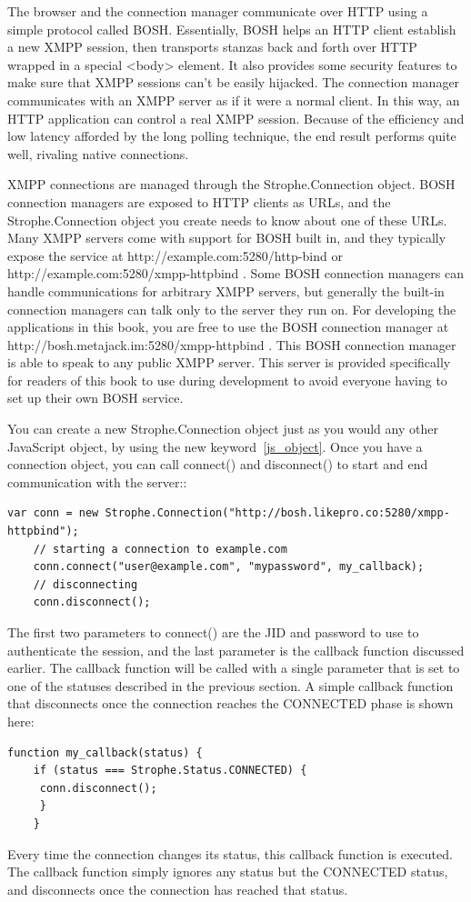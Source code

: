 	The browser and the connection manager communicate over HTTP using a simple protocol called BOSH. Essentially, BOSH helps an HTTP client establish a new XMPP session, then transports stanzas back and forth over HTTP wrapped in a special <body> element. It also provides some security features to make sure that XMPP sessions can’t be easily hijacked. The connection manager communicates with an XMPP server as if it were a normal client. In this way, an HTTP application can control a real XMPP session. Because of the efficiency and low latency afforded by the long polling technique, the end result performs quite well, rivaling native connections.

	XMPP connections are managed through the Strophe.Connection object. BOSH connection managers are exposed to HTTP clients as URLs, and the Strophe.Connection object you create needs to know about one of these URLs. Many XMPP servers come with support for BOSH built in, and they typically expose the service at http://example.com:5280/http-bind or http://example.com:5280/xmpp-httpbind . Some BOSH connection managers can handle communications for arbitrary XMPP servers, but generally the built-in connection managers can talk only to the server they run on. For developing the applications in this book, you are free to use the BOSH connection manager at http://bosh.metajack.im:5280/xmpp-httpbind . This BOSH connection manager is able to speak to any public XMPP server. This server is provided specifically for readers of this book to use during development to avoid everyone having to set up their own BOSH service.

	You can create a new Strophe.Connection object just as you would any other JavaScript object, by
using the new keyword~\ref{js_object}.	Once you have a connection object, you can call connect() and disconnect() to start and end	communication with the server::
\begin{lstlisting}[label=js_object,caption=Stanzas Format]
	var conn = new Strophe.Connection("http://bosh.likepro.co:5280/xmpp-httpbind");
	// starting a connection to example.com
	conn.connect("user@example.com", "mypassword", my_callback);
	// disconnecting
	conn.disconnect();
\end{lstlisting}
	The first two parameters to connect() are the JID and password to use to authenticate the session,
	and the last parameter is the callback function discussed earlier. The callback function will be called
	with a single parameter that is set to one of the statuses described in the previous section. A simple
	callback function that disconnects once the connection reaches the CONNECTED phase is shown here:
\begin{lstlisting}[label=js_object,caption=Stanzas Format]
	function my_callback(status) {
	if (status === Strophe.Status.CONNECTED) {
	 conn.disconnect();
	 }
    }
\end{lstlisting}
Every time the connection changes its status, this callback function is executed. The callback function simply ignores any status but the CONNECTED status, and disconnects once the connection
has reached that status.


